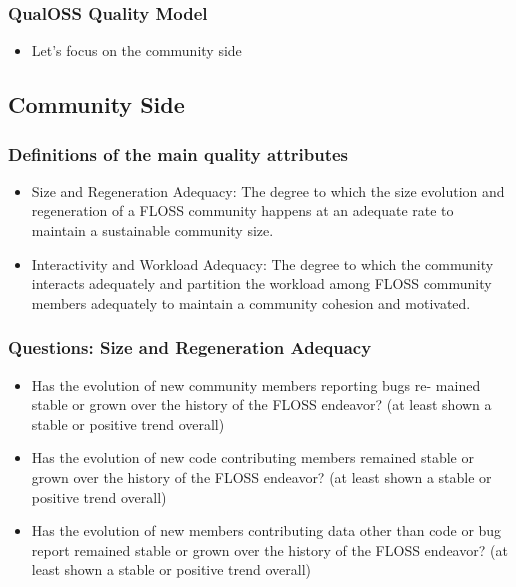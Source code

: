 \documentclass{beamer}
\begin{document}
\begin{frame}
\frametitle{QualOSS Quality Model}
\begin{center}
\begin{itemize}
\item Let's focus on the community side
\end{itemize}

\end{center}
\end{frame}


\subsection{Community Side}

\begin{frame}
\frametitle{Definitions of the main quality attributes}
\begin{center}
\begin{itemize}
\item Size and Regeneration Adequacy: The degree to which the size evolution and regeneration of a FLOSS community happens at an adequate rate to maintain a sustainable community size.

\item Interactivity and Workload Adequacy:   The degree to which the community interacts adequately and partition the workload among FLOSS community members adequately to maintain a community cohesion and motivated.
\end{itemize}
\end{center}
\end{frame}


\begin{frame}
\frametitle{Questions: Size and Regeneration Adequacy}
\begin{center}
\begin{itemize}
\item Has the evolution of new community members reporting bugs re-
mained stable or grown over the history of the FLOSS endeavor? (at
least shown a stable or positive trend overall)
\item  Has the evolution of new code contributing members remained stable
or grown over the history of the FLOSS endeavor? (at least shown a
stable or positive trend overall)
\item  Has the evolution of new members contributing data other than code
or bug report remained stable or grown over the history of the FLOSS
endeavor? (at least shown a stable or positive trend overall)
\end{itemize}
\end{center}
\end{frame}
\end{document}
